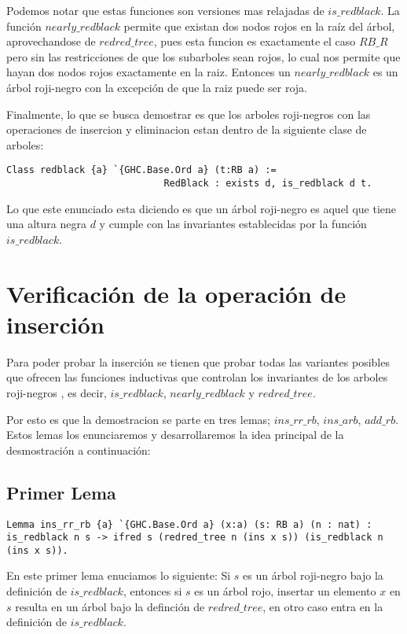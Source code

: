 \documentclass[letterpaper,12pt,oneside]{book}
\newcommand{\arn}{árbol roji-negro }
\newcommand{\arns}{arboles roji-negros }
\theoremstyle{plain}
\theoremstyle{definition}
\theoremstyle{remark}
\begin{document}
Podemos notar que estas funciones son versiones mas relajadas de $is\_redblack$. La funci\'on $nearly\_redblack$ permite que existan dos nodos rojos
en la ra\'iz del \'arbol, aprovechandose de $redred\_tree$, pues esta funcion es exactamente el caso $RB\_R$ pero sin las restricciones de que los subarboles sean rojos, lo 
cual nos permite que hayan dos nodos rojos exactamente en la raiz. Entonces un $nearly\_redblack$ es un \arn con la excepci\'on de que la raiz puede ser roja. 

Finalmente, lo que se busca demostrar es que los \arns con las operaciones de insercion y eliminacion estan dentro de la siguiente clase de arboles:

\begin{verbatim}
Class redblack {a} `{GHC.Base.Ord a} (t:RB a) := 
                            RedBlack : exists d, is_redblack d t.
\end{verbatim}

Lo que este enunciado esta diciendo es que un \arn es aquel que tiene una altura negra $d$ y cumple con las invariantes establecidas por la funci\'on 
$is\_redblack$.
\section{Verificación de la operación de inserción}

Para poder probar la inserci\'on se tienen que probar todas las variantes posibles que ofrecen las funciones inductivas
que controlan los invariantes de los \arns, es decir, $is\_redblack$, $nearly\_redblack$ y $redred\_tree$.

Por esto es que la demostracion se parte en tres lemas; $ins\_rr\_rb$, $ins\_arb$, $add\_rb$. Estos lemas los enunciaremos y desarrollaremos la idea principal
de la desmostraci\'on a continuaci\'on:

\subsection{Primer Lema}

\begin{verbatim}
Lemma ins_rr_rb {a} `{GHC.Base.Ord a} (x:a) (s: RB a) (n : nat) :
is_redblack n s -> ifred s (redred_tree n (ins x s)) (is_redblack n (ins x s)).
\end{verbatim}
 En este primer lema enuciamos lo siguiente: Si $s$ es un \arn bajo la definici\'on de $is\_redblack$, entonces 
 si $s$ es un \'arbol rojo, insertar un elemento $x$ en $s$ resulta en un \'arbol bajo la definci\'on de 
 $redred\_tree$, en otro caso entra en la definici\'on de $is\_redblack$.
\end{document}
